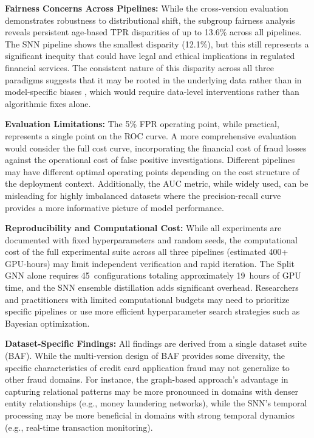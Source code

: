 \textbf{Fairness Concerns Across Pipelines:} While the cross-version evaluation demonstrates robustness to distributional shift, the subgroup fairness analysis reveals persistent age-based TPR disparities of up to 13.6\% across all pipelines. The SNN pipeline shows the smallest disparity (12.1\%), but this still represents a significant inequity that could have legal and ethical implications in regulated financial services. The consistent nature of this disparity across all three paradigms suggests that it may be rooted in the underlying data rather than in model-specific biases \cite{chouldechova2017fair,kozodoi2022fairness}, which would require data-level interventions rather than algorithmic fixes alone.

\textbf{Evaluation Limitations:} The 5\% FPR operating point, while practical, represents a single point on the ROC curve. A more comprehensive evaluation would consider the full cost curve, incorporating the financial cost of fraud losses against the operational cost of false positive investigations. Different pipelines may have different optimal operating points depending on the cost structure of the deployment context. Additionally, the AUC metric, while widely used, can be misleading for highly imbalanced datasets where the precision-recall curve provides a more informative picture of model performance.

\textbf{Reproducibility and Computational Cost:} While all experiments are documented with fixed hyperparameters and random seeds, the computational cost of the full experimental suite across all three pipelines (estimated 400+ GPU-hours) may limit independent verification and rapid iteration. The Split GNN alone requires 45~configurations totaling approximately 19~hours of GPU time, and the SNN ensemble distillation adds significant overhead. Researchers and practitioners with limited computational budgets may need to prioritize specific pipelines or use more efficient hyperparameter search strategies such as Bayesian optimization.

\textbf{Dataset-Specific Findings:} All findings are derived from a single dataset suite (BAF). While the multi-version design of BAF provides some diversity, the specific characteristics of credit card application fraud may not generalize to other fraud domains. For instance, the graph-based approach's advantage in capturing relational patterns may be more pronounced in domains with denser entity relationships (e.g., money laundering networks), while the SNN's temporal processing may be more beneficial in domains with strong temporal dynamics (e.g., real-time transaction monitoring).

